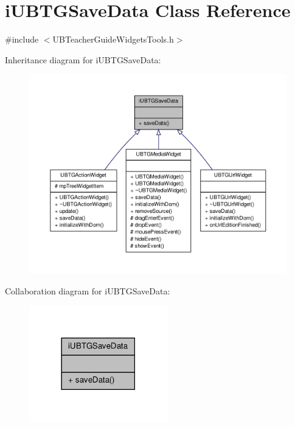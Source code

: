 \hypertarget{classi_u_b_t_g_save_data}{\section{i\-U\-B\-T\-G\-Save\-Data Class Reference}
\label{d6/d3f/classi_u_b_t_g_save_data}
}


{\ttfamily \#include $<$U\-B\-Teacher\-Guide\-Widgets\-Tools.\-h$>$}



Inheritance diagram for i\-U\-B\-T\-G\-Save\-Data\-:
\nopagebreak
\begin{figure}[H]
\begin{center}
\leavevmode
\includegraphics[width=350pt]{df/d7c/classi_u_b_t_g_save_data__inherit__graph}
\end{center}
\end{figure}


Collaboration diagram for i\-U\-B\-T\-G\-Save\-Data\-:
\nopagebreak
\begin{figure}[H]
\begin{center}
\leavevmode
\includegraphics[width=170pt]{d0/df8/classi_u_b_t_g_save_data__coll__graph}
\end{center}
\end{figure}
